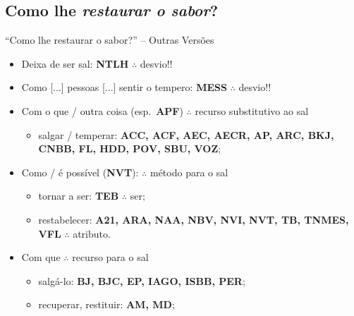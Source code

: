 \documentclass[12pt,aspectratio=169]{beamer}
\newcommand{\RED}[1]{{\textcolor{TXred}{#1}}}
\newcommand{\ORA}[1]{{\textcolor{TXora}{#1}}}
\newcommand{\YEL}[1]{{\textcolor{TXyel}{#1}}}
\newcommand{\BRI}[1]{{\textcolor{BSpbg}{#1}}}   %
\begin{document}
    \subsection{Como lhe \textit{restaurar o sabor\/}?}

    \begin{frame}{\BRI{``Como lhe restaurar o sabor?''} -- Outras Versões}
        \begin{itemize}
            \item<1-> \RED{Deixa de ser sal}:
                \BRI{\textbf{NTLH}}
                $\therefore$ desvio!!
            \item<1-> \RED{Como [...] pessoas [...] sentir o tempero}:
                \BRI{\textbf{MESS}}
                $\therefore$ desvio!!
            \item<2-> \ORA{Com o que} / \ORA{outra coisa} (esp.~\BRI{\bf APF})
                $\therefore$ recurso substitutivo ao sal
                \begin{itemize}
                    \item \ORA{salgar} / \ORA{temperar}:
                        \BRI{\textbf{ACC, ACF, AEC, AECR, AP, ARC, BKJ, CNBB, FL, HDD, POV, SBU,
                            VOZ}};
                \end{itemize}
            \item<3-> \YEL{Como} / \YEL{é possível} (\BRI{\bf NVT}):
                $\therefore$ método para o sal
                \begin{itemize}
                    \item \YEL{tornar a ser}:
                        \BRI{\textbf{TEB}}
                        $\therefore$ ser;
                    \item \YEL{restabelecer}:
                        \BRI{\textbf{A21, ARA, NAA, NBV, NVI, NVT, TB, TNMES, VFL}}
                        $\therefore$ atributo.
                \end{itemize}
            \item<3-> \YEL{Com que}
                $\therefore$ recurso para o sal
                \begin{itemize}
                    \item \YEL{salgá-lo}:
                        \BRI{\textbf{BJ, BJC, EP, IAGO, ISBB, PER}};
                    \item \YEL{recuperar, restituir}:
                        \BRI{\textbf{AM, MD}};
                \end{itemize}
        \end{itemize}
    \end{frame}
\end{document}
